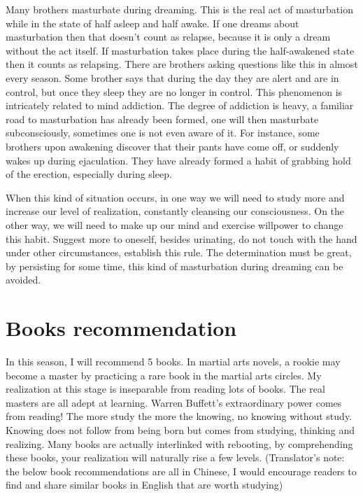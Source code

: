 \documentclass[
]{book}
\begin{document}
Many brothers masturbate during dreaming. This is the real act of masturbation while in the state of half asleep and half awake. If one dreams about masturbation then that doesn't count as relapse, because it is only a dream without the act itself. If masturbation takes place during the half-awakened state then it counts as relapsing. There are brothers asking questions like this in almost every season. Some brother says that during the day they are alert and are in control, but once they sleep they are no longer in control. This phenomenon is intricately related to mind addiction. The degree of addiction is heavy, a familiar road to masturbation has already been formed, one will then masturbate subconsciously, sometimes one is not even aware of it. For instance, some brothers upon awakening discover that their pants have come off, or suddenly wakes up during ejaculation. They have already formed a habit of grabbing hold of the erection, especially during sleep.

When this kind of situation occurs, in one way we will need to study more and increase our level of realization, constantly cleansing our consciousness. On the other way, we will need to make up our mind and exercise willpower to change this habit. Suggest more to oneself, besides urinating, do not touch with the hand under other circumstances, establish this rule. The determination must be great, by persisting for some time, this kind of masturbation during dreaming can be avoided.

\hypertarget{books-recommendation}{%
\section{Books recommendation}\label{books-recommendation}}

In this season, I will recommend 5 books. In martial arts novels, a rookie may become a master by practicing a rare book in the martial arts circles. My realization at this stage is inseparable from reading lots of books. The real masters are all adept at learning. Warren Buffett's extraordinary power comes from reading! The more study the more the knowing, no knowing without study. Knowing does not follow from being born but comes from studying, thinking and realizing. Many books are actually interlinked with rebooting, by comprehending these books, your realization will naturally rise a few levels. (Translator's note: the below book recommendations are all in Chinese, I would encourage readers to find and share similar books in English that are worth studying)
\end{document}
